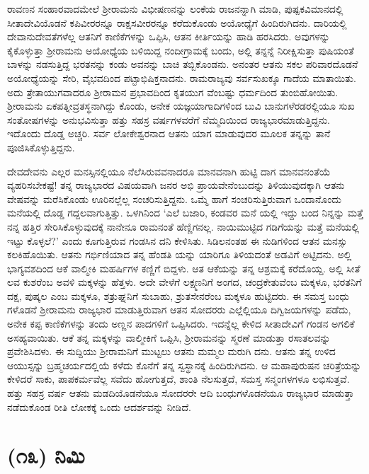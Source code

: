 ರಾವಣನ ಸಂಹಾರವಾದಮೇಲೆ ಶ್ರೀರಾಮನು ವಿಭೀಷಣನನ್ನು ಲಂಕೆಯ ರಾಜನನ್ನಾಗಿ ಮಾಡಿ, ಪುಷ್ಪಕವಿಮಾನದಲ್ಲಿ ಸೀತಾದೇವಿಯೊಡನೆ ಕಪಿವೀರರನ್ನೂ ರಾಕ್ಷಸವೀರರನ್ನೂ ಕರೆದುಕೊಂಡು ಅಯೋಧ್ಯೆಗೆ ಹಿಂದಿರುಗಿದನು. ದಾರಿಯಲ್ಲಿ ದೇವಾನುದೇವತೆಗಳೆಲ್ಲ ಆತನಿಗೆ ಕಾಣಿಕೆಗಳನ್ನು ಒಪ್ಪಿಸಿ, ಆತನ ಕೀರ್ತಿಯನ್ನು ಹಾಡಿ ಹರಸಿದರು. ಅವುಗಳನ್ನು ಕೈಕೊಳ್ಳುತ್ತಾ ಶ್ರೀರಾಮನು ಅಯೋಧ್ಯೆಯ ಬಳಿಯಿದ್ದ ನಂದೀಗ್ರಾಮಕ್ಕೆ ಬಂದು, ಅಲ್ಲಿ ತನ್ನನ್ನೆ ನಿರೀಕ್ಷಿಸುತ್ತಾ ಪುಷಿಯಂತೆ ಬಾಳನ್ನು ನಡಸುತ್ತಿದ್ದ ಭರತನನ್ನು ಕಂಡು ಅವನನ್ನು ಬಾಚಿ ತಬ್ಬಿಕೊಂಡನು. ಅನಂತರ ಆತನು ಸಕಲ ಪರಿವಾರದೊಡನೆ ಅಯೋಧ್ಯೆಯನ್ನು ಸೇರಿ, ವೈಭವದಿಂದ ಪಟ್ಟಾಭಿಷಿಕ್ತನಾದನು. ರಾಮರಾಜ್ಯವು ಸರ್ವಸುಖಕ್ಕೂ ಗಾದೆಯ ಮಾತಾಯಿತು. ಅದು ತ್ರೇತಾಯುಗವಾದರೂ ಶ್ರೀರಾಮನ ಪ್ರಭಾವದಿಂದ ಕೃತಯುಗ ವೆಂಬಷ್ಟು ಧರ್ಮದಿಂದ ತುಂಬಿಹೋಯಿತು. ಶ್ರೀರಾಮನು ಏಕಪತ್ನೀವ್ರತಸ್ಥನಾಗಿದ್ದು ಕೊಂಡು, ಅನೇಕ ಯಜ್ಞಯಾಗಾದಿಗಳಿಂದ ಬುವಿ ಬಾನುಗಳೆರಡರಲ್ಲಿಯೂ ಸುಖ ಸಂತೋಷಗಳನ್ನು ಅನುಭವಿಸುತ್ತಾ ಹತ್ತು ಸಹಸ್ರ ವರ್ಷಗಳವರೆಗೆ ನೆಮ್ಮದಿಯಿಂದ ರಾಜ್ಯಭಾರಮಾಡುತ್ತಿದ್ದನು. ಇದೊಂದು ದೊಡ್ಡ ಅಚ್ಚರಿ. ಸರ್ವ ಲೋಕೇಶ್ವರನಾದ ಆತನು ಯಾಗ ಮಾಡುವುದರ ಮೂಲಕ ತನ್ನನ್ನು ತಾನೆ ಪೂಜಿಸಿಕೊಳ್ಳುತ್ತಿದ್ದನು. 

ದೇವದೇವನು ಎಲ್ಲರ ಮನಸ್ಸಿನಲ್ಲಿಯೂ ನೆಲೆಸಿರುವವನಾದರೂ ಮಾನವನಾಗಿ ಹುಟ್ಟಿ ದಾಗ ಮಾನವನಂತೆಯೆ ವ್ಯಹರಿಸಬೇಕಷ್ಟೆ! ತನ್ನ ರಾಜ್ಯಭಾರದ ವಿಷಯವಾಗಿ ಜನರ ಅಭಿ ಪ್ರಾಯವೇನೆಂಬುದನ್ನು ತಿಳಿಯುವುದಕ್ಕಾಗಿ ಆತನು ವೇಷವನ್ನು ಮರೆಸಿಕೊಂಡು ಊರಿನಲ್ಲೆಲ್ಲ ಸಂಚರಿಸುತ್ತಿದ್ದನು. ಒಮ್ಮೆ ಹಾಗೆ ಸಂಚರಿಸುತ್ತಿರುವಾಗ ಒಂದಾನೊಂದು ಮನೆಯಲ್ಲಿ ದೊಡ್ಡ ಗದ್ದಲವಾಗುತ್ತಿತ್ತು. ಒಳಗಿನಿಂದ ‘ಎಲೆ ಬಜಾರಿ, ಕಂಡವರ ಮನೆ ಯಲ್ಲಿ ಇದ್ದು ಬಂದ ನಿನ್ನನ್ನು ಮತ್ತೆ ನನ್ನ ಹತ್ತಿರ ಸೇರಿಸಿಕೊಳ್ಳುವುದಕ್ಕೆ ನಾನೇನೂ ರಾಮನಂತೆ ಹೆಣ್ಣಿಗನಲ್ಲ. ನಾಯಿಮುಟ್ಟಿದ ಗಡಿಗೆಯನ್ನು ಮತ್ತೆ ಮನೆಯಲ್ಲಿ ಇಟ್ಟು ಕೊಳ್ಳಲೆ?’ ಎಂದು ಕೂಗುತ್ತಿರುವ ಗಂಡಸಿನ ದನಿ ಕೇಳಿಸಿತು. ಸಿಡಿಲನಂತಹ ಈ ನುಡಿಗಳಿಂದ ಆತನ ಮನಸ್ಸು ಕಲಕಿಹೊಯಿತು. ಆತನು ಗರ್ಭಿಣಿಯಾದ ತನ್ನ ಹೆಂಡತಿ ಯನ್ನು ಯಾರಿಗೂ ತಿಳಿಯದಂತೆ ಅಡವಿಗೆ ಅಟ್ಟಿದನು. ಅಲ್ಲಿ ಭಾಗ್ಯವಶದಿಂದ ಆಕೆ ವಾಲ್ಮೀಕಿ ಮಹರ್ಷಿಗಳ ಕಣ್ಣಿಗೆ ಬಿದ್ದಳು. ಆತ ಆಕೆಯನ್ನು ತನ್ನ ಆಶ್ರಮಕ್ಕೆ ಕರೆದೊಯ್ದ. ಅಲ್ಲಿ ಸೀತೆ ಲವ ಕುಶರೆಂಬ ಅವಳಿ ಮಕ್ಕಳನ್ನು ಹೆತ್ತಳು. ಅದೇ ವೇಳೆಗೆ ಲಕ್ಷ್ಮಣನಿಗೆ ಅಂಗದ, ಚಂದ್ರಕೇತುವೆಂಬ ಮಕ್ಕಳೂ, ಭರತನಿಗೆ ದಕ್ಷ, ಪುಷ್ಕಲ ಎಂಬ ಮಕ್ಕಳೂ, ಶತ್ರುಘ್ನನಿಗೆ ಸುಬಾಹು, ಶ್ರುತಸೇನರೆಂಬ ಮಕ್ಕಳೂ ಹುಟ್ಟಿದರು. ಈ ಸಮಸ್ತ ಬಂಧು ಗಳೊಡನೆ ಶ್ರೀರಾಮನು ರಾಜ್ಯಭಾರ ಮಾಡುತ್ತಿರುವಾಗ ಆತನ ಸೋದರರು ಎಲ್ಲೆಲ್ಲಿಯೂ ದಿಗ್ವಿಜಯಗಳನ್ನು ಪಡೆದು, ಅನೇಕ ಕಪ್ಪ ಕಾಣಿಕೆಗಳನ್ನು ತಂದು ಅಣ್ಣನ ಪಾದಗಳಿಗೆ ಒಪ್ಪಿಸಿದರು. ಇದನ್ನೆಲ್ಲ ಕೇಳಿದ ಸೀತಾದೇವಿಗೆ ಗಂಡನ ಅಗಲಿಕೆ ಅಸಹ್ಯವಾಯಿತು. ಆಕೆ ತನ್ನ ಮಕ್ಕಳನ್ನು ವಾಲ್ಮೀಕಿಗೆ ಒಪ್ಪಿಸಿ, ಶ್ರೀರಾಮನನ್ನು ಸ್ಮರಣೆ ಮಾಡುತ್ತಾ ರಸಾತಲವನ್ನು ಪ್ರವೇಶಿಸಿದಳು. ಈ ಸುದ್ದಿಯು ಶ್ರೀರಾಮನಿಗೆ ಮುಟ್ಟಲು ಆತನು ಮಮ್ಮಲ ಮರುಗಿ ದನು. ಆತನು ತನ್ನ ಉಳಿದ ಆಯುಸ್ಸನ್ನು ಬ್ರಹ್ಮಚರ್ಯದಲ್ಲಿಯೆ ಕಳೆದು ಕೊನೆಗೆ ತನ್ನ ಸ್ವಸ್ಥಾನಕ್ಕೆ ಹಿಂದಿರುಗಿದನು. ಆ ಮಹಾಪುರುಷನ ಚರಿತ್ರೆಯನ್ನು ಕೇಳಿದರೆ ಸಾಕು, ಪಾಪಕರ್ಮವೆಲ್ಲ ಸವೆದು ಹೋಗುತ್ತದೆ, ಶಾಂತಿ ನೆಲಸುತ್ತದೆ, ಸಮಸ್ತ ಸನ್ಮಂಗಳಗಳೂ ಲಭಿಸುತ್ತವೆ. ಹತ್ತು ಸಹಸ್ರ ವರ್ಷ ಆತನು ಮಡದಿಯೊಡನೆಯೂ ಸೋದರರೇ ಆದಿ ಬಂಧುಗಳೊಡನೆಯೂ ರಾಜ್ಯಭಾರ ಮಾಡುತ್ತಾ ನಡೆದುಕೊಂಡ ರೀತಿ ಲೋಕಕ್ಕೆ ಒಂದು ಆದರ್ಶವನ್ನು ನೀಡಿದೆ.


\section{(೧೩) ನಿಮಿ}

